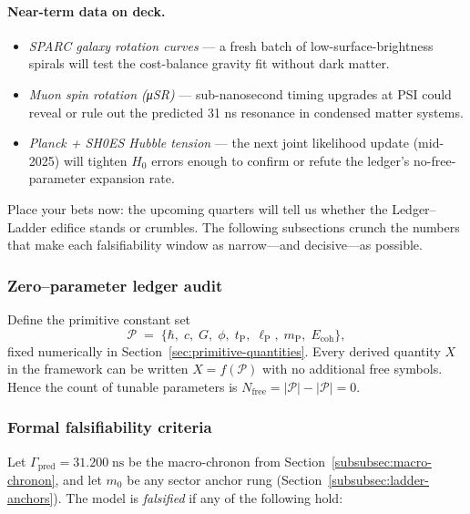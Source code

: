 \documentclass[11pt,oneside]{book}
\begin{document}
\paragraph{Near-term data on deck.}
\begin{itemize}
  \item \emph{SPARC galaxy rotation curves} — a fresh batch of low-surface-brightness
        spirals will test the cost-balance gravity fit without dark matter.
  \item \emph{Muon spin rotation (μSR)} — sub-nanosecond timing upgrades at PSI
        could reveal or rule out the predicted 31 ns resonance in condensed
        matter systems.
  \item \emph{Planck + SH0ES Hubble tension} — the next joint likelihood
        update (mid-2025) will tighten $H_{0}$ errors enough to confirm or
        refute the ledger’s no-free-parameter expansion rate.
\end{itemize}

Place your bets now: the upcoming quarters will tell us whether the
Ledger–Ladder edifice stands or crumbles.  The following subsections crunch
the numbers that make each falsifiability window as narrow—and decisive—as
possible.

\subsubsection{Zero–parameter ledger audit}
\label{subsubsec:zero-param}
Define the primitive constant set
\[
  \mathcal{P}
  \;=\;
  \{\hbar,\;c,\;G,\;\phi,\;
    t_{\text{P}},\;\ell_{\text{P}},\;m_{\text{P}},\;
    E_{\text{coh}}\},
\]
fixed numerically in
Section~\ref{sec:primitive-quantities}.  
Every derived quantity \(X\) in the framework can be written
\(X = f(\mathcal{P})\) with no additional free symbols.
Hence the count of tunable parameters is
\(
  N_{\text{free}} = |\mathcal{P}| - |\mathcal{P}| = 0.
\)

\subsubsection{Formal falsifiability criteria}
\label{subsubsec:falsify-criteria}
Let \(\Gamma_{\text{pred}} = 31.200\;\text{ns}\) be the
macro-chronon from Section~\ref{subsubsec:macro-chronon},
and let \(m_{0}\) be any sector anchor rung
(Section~\ref{subsubsec:ladder-anchors}).  
The model is \emph{falsified} if any of the following hold:
\end{document}

